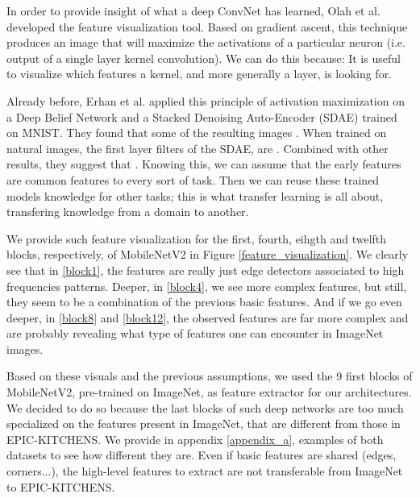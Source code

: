 \documentclass[12pt, a4paper]{report}
\begin{document}
					In order to provide insight of what a deep ConvNet has learned, Olah et al. \cite{olah2017feature} developed the feature visualization tool.
					Based on gradient ascent, this technique produces an image that will maximize the activations of a particular neuron (i.e. output of a single layer kernel convolution).
					We can do this because:  
					It is useful to visualize which features a kernel, and more generally a layer, is looking for.
					\par
					Already before, Erhan et al. \cite{erhan2009visualizing} applied this principle of activation maximization on a Deep Belief Network and a Stacked Denoising Auto-Encoder (SDAE) trained on MNIST.
					They found that some of the resulting images .
					When trained on natural images, the first layer filters of the SDAE, are .
					Combined with other results, they suggest that .
				Knowing this, we can assume that the early features are common features to every sort of task.
				Then we can reuse these trained models knowledge for other tasks; this is what transfer learning is all about, transfering knowledge from a domain to another.
				\par
				We provide such feature visualization for the first, fourth, eihgth and twelfth blocks, respectively, of MobileNetV2 in Figure \ref{feature_visualization}.
				We clearly see that in \ref{block1}, the features are really just edge detectors associated to high frequencies patterns.
				Deeper, in \ref{block4}, we see more complex features, but still, they seem to be a combination of the previous basic features.
				And if we go even deeper, in \ref{block8} and \ref{block12}, the observed features are far more complex and are probably revealing what type of features one can encounter in ImageNet images.
				\par
				Based on these visuals and the previous assumptions, we used the 9 first blocks of MobileNetV2, pre-trained on ImageNet, as feature extractor for our architectures.
				We decided to do so because the last blocks of such deep networks are too much specialized on the features present in ImageNet, that are different from those in EPIC-KITCHENS.
				We provide in appendix \ref{appendix_a}, examples of both datasets to see how different they are.
				Even if basic features are shared (edges, corners...), the high-level features to extract are not transferable from ImageNet to EPIC-KITCHENS.
\end{document}
